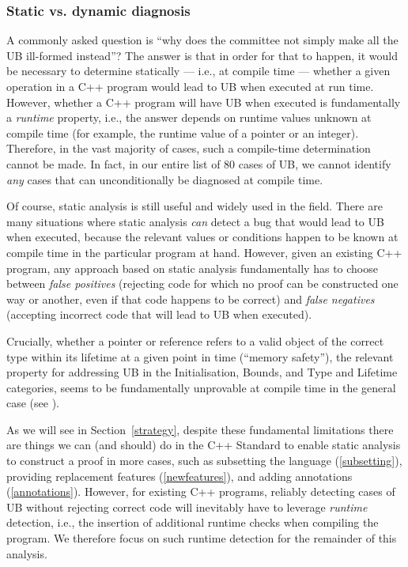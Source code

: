 \subsubsection{Static vs. dynamic diagnosis}
\label{statically}

A commonly asked question is ``why does the committee not simply make all the UB ill-formed instead''? The answer is that in order for that to happen, it would be necessary to determine statically --- i.e., at compile time --- whether a given operation in a C++ program would lead to UB when executed at run time. However, whether a C++ program will have UB when executed is fundamentally a \emph{runtime} property, i.e., the answer depends on runtime values unknown at compile time (for example, the runtime value of a pointer or an integer). Therefore, in the vast majority of cases, such a compile-time determination cannot be made. In fact, in our entire list of 80 cases of UB, we cannot identify \emph{any} cases that can unconditionally be diagnosed at compile time.

Of course, static analysis is still useful and widely used in the field. There are many situations where static analysis \emph{can} detect a bug that would lead to UB when executed, because the relevant values or conditions happen to be known at compile time in the particular program at hand. However, given an existing C++ program, any approach based on static analysis fundamentally has to choose between \emph{false positives} (rejecting code for which no proof can be constructed one way or another, even if that code happens to be correct) and \emph{false negatives} (accepting incorrect code that will lead to UB when executed). 

Crucially, whether a pointer or reference refers to a valid object of the correct type within its lifetime at a given point in time (``memory safety''), the relevant property for addressing UB in the Initialisation, Bounds, and Type and Lifetime categories, seems to be fundamentally unprovable at compile time in the general case (see \cite{Baxter2024}). %

As we will see in Section~\ref{strategy}, despite these fundamental limitations there are things we can (and should) do in the C++ Standard to enable static analysis to construct a proof in more cases, such as subsetting the language (\ref{subsetting}), providing replacement features (\ref{newfeatures}), and adding annotations (\ref{annotations}). However, for existing C++ programs, reliably detecting cases of UB without rejecting correct code will inevitably have to leverage \emph{runtime} detection, i.e., the insertion of additional runtime checks when compiling the program. We therefore focus on such runtime detection for the remainder of this analysis.


